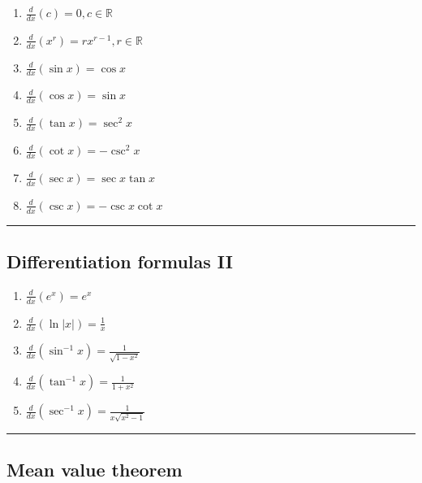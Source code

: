 \documentclass[
  landscape,  
  10pt,
]{article}
\begin{document}
\begin{multicols}{3}
\begin{enumerate}
\def\labelenumi{\arabic{enumi}.}
\item
  \(\displaystyle\frac{d}{dx}(c)=0, c \in \mathbb{R}\)
\item
  \(\displaystyle\frac{d}{dx}(x^r)=rx^{r-1}, r \in \mathbb{R}\)
\item
  \(\displaystyle\frac{d}{dx}(\sin x)=\cos x\)
\item
  \(\displaystyle\frac{d}{dx}(\cos x)=\sin x\)
\item
  \(\displaystyle\frac{d}{dx}(\tan x)=\sec^2x\)
\item
  \(\displaystyle\frac{d}{dx}(\cot x)=-\csc^2x\)
\item
  \(\displaystyle\frac{d}{dx}(\sec x) = \sec x\tan x\)
\item
  \(\displaystyle\frac{d}{dx}(\csc x)=-\csc x\cot x\)
\end{enumerate}

\begin{center}\rule{0.5\linewidth}{0.5pt}\end{center}

\hypertarget{differentiation-formulas-ii}{%
\subsection{Differentiation formulas
II}\label{differentiation-formulas-ii}}

\begin{enumerate}
\def\labelenumi{\arabic{enumi}.}
\item
  \(\displaystyle\frac{d}{dx}(e^x) = e^x\)
\item
  \(\displaystyle\frac{d}{dx}(\ln|x|) = \frac{1}{x}\)
\item
  \(\displaystyle\frac{d}{dx}(\sin^{-1}x) = \frac{1}{\sqrt{1-x^2}}\)
\item
  \(\displaystyle\frac{d}{dx}(\tan^{-1}x) = \frac{1}{1+x^2}\)
\item
  \(\displaystyle\frac{d}{dx}(\sec^{-1}x) = \frac{1}{x \sqrt{x^2-1}}\)
\end{enumerate}

\begin{center}\rule{0.5\linewidth}{0.5pt}\end{center}

\hypertarget{mean-value-theorem}{%
\subsection{Mean value theorem}\label{mean-value-theorem}}


\end{multicols}
\end{document}

